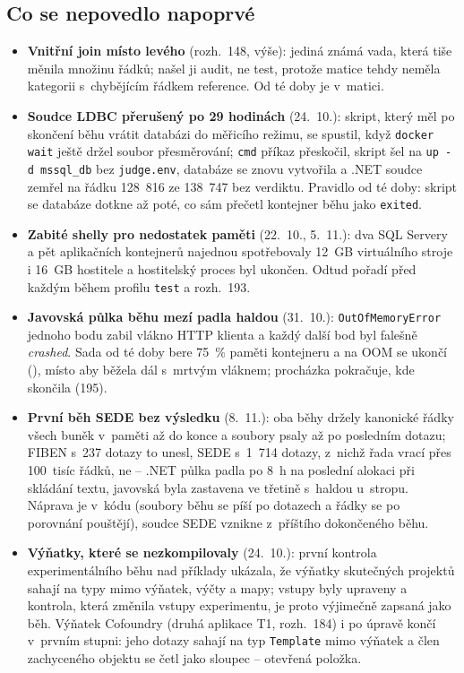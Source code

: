 \documentclass{article}
\begin{document}
\subsection{Co se nepovedlo napoprvé}\label{sec:nepovedlo}

\begin{itemize}[leftmargin=*,itemsep=2pt]
\item \textbf{Vnitřní join místo levého} (rozh.~148, výše): jediná známá vada, která tiše měnila množinu řádků; našel ji audit, ne test, protože matice tehdy neměla kategorii s~chybějícím řádkem reference. Od té doby je v~matici.
\item \textbf{Soudce LDBC přerušený po 29 hodinách} (24.~10.): skript, který měl po skončení běhu vrátit databázi do měřicího režimu, se spustil, když \texttt{docker wait} ještě držel soubor přesměrování; \texttt{cmd} příkaz přeskočil, skript šel na \texttt{up -d mssql\_db} bez \texttt{judge.env}, databáze se znovu vytvořila a .NET soudce zemřel na řádku 128~816 ze 138~747 bez verdiktu. Pravidlo od té doby: skript se databáze dotkne až poté, co sám přečetl kontejner běhu jako \texttt{exited}.
\item \textbf{Zabité shelly pro nedostatek paměti} (22.~10., 5.~11.): dva SQL Servery a pět aplikačních kontejnerů najednou spotřebovaly 12~GB virtuálního stroje i 16~GB hostitele a hostitelský proces byl ukončen. Odtud pořadí  před každým během profilu \texttt{test} a rozh.~193.
\item \textbf{Javovská půlka běhu mezí padla haldou} (31.~10.): \texttt{OutOfMemoryError} jednoho bodu zabil vlákno HTTP klienta a každý další bod byl falešně \emph{crashed}. Sada od té doby bere 75~\% paměti kontejneru a na OOM se ukončí (), místo aby běžela dál s~mrtvým vláknem; procházka pokračuje, kde skončila (195).
\item \textbf{První běh SEDE bez výsledku} (8.~11.): oba běhy držely kanonické řádky všech buněk v~paměti až do konce a soubory psaly až po posledním dotazu; FIBEN s~237 dotazy to unesl, SEDE s~1~714 dotazy, z~nichž řada vrací přes 100~tisíc řádků, ne -- .NET půlka padla po 8~h na poslední alokaci při skládání textu, javovská byla zastavena ve třetině s~haldou u~stropu. Náprava je v~kódu (soubory běhu se píší po dotazech a řádky se po porovnání pouštějí), soudce SEDE vznikne z~příštího dokončeného běhu.
\item \textbf{Výňatky, které se nezkompilovaly} (24.~10.): první kontrola experimentálního běhu nad příklady ukázala, že výňatky skutečných projektů sahají na typy mimo výňatek, výčty a mapy; vstupy byly upraveny a kontrola, která změnila vstupy experimentu, je proto výjimečně zapsaná jako běh. Výňatek Cofoundry (druhá aplikace T1, rozh.~184) i po úpravě končí v~prvním stupni: jeho dotazy sahají na typ \texttt{Template} mimo výňatek a člen zachyceného objektu se četl jako sloupec -- otevřená položka.

\end{itemize}
\end{document}
